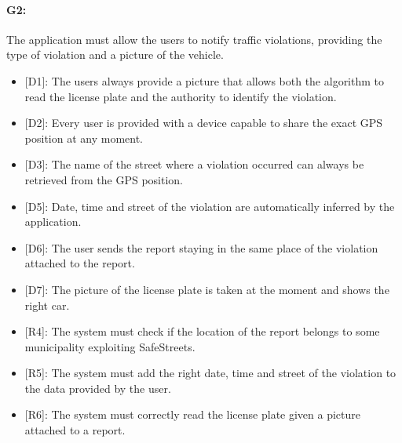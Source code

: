 \documentclass[12pt,a4paper]{report}
\begin{document}
			\paragraph {G2:} The application must allow the users to notify traffic violations, providing the type of violation and a picture of the vehicle.
			\begin{itemize}
				\item{[D1]}: The users always provide a picture that allows both the algorithm to read the license plate and the authority to identify the violation.
				\item{[D2]}: Every user is provided with a device capable to share the exact GPS position at any moment.
				\item{[D3]}: The name of the street where a violation occurred can always be retrieved from the GPS position.
				\item{[D5]}: Date, time and street of the violation are automatically inferred by the application.
				\item{[D6]}: The user sends the report staying in the same place of the violation attached to the report.
		 		\item{[D7]}: The picture of the license plate is taken at the moment and shows the right car.
			\end{itemize}
			\begin{itemize}
				\item{[R4]}: The system must check if the location of the report belongs to some municipality exploiting SafeStreets.
				\item{[R5]}: The system must add the right date, time and street of the violation to the data provided by the user.
				\item{[R6]}: The system must correctly read the license plate given a picture attached to a report.
			\end{itemize}
\end{document}

